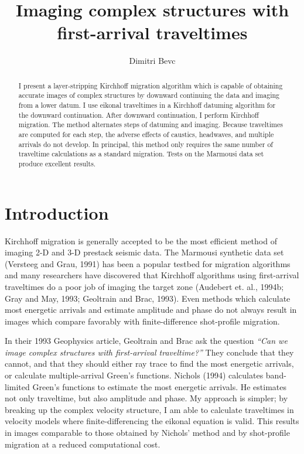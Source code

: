 \title{Imaging complex structures with first-arrival traveltimes}
\author{Dimitri Bevc}
\def\figdir{./Fig}

\begin{abstract}
I present a layer-stripping Kirchhoff migration algorithm which is
capable of obtaining accurate
images of complex structures by downward continuing
the data and imaging from a lower datum.
I use eikonal traveltimes in a Kirchhoff datuming algorithm for the
downward continuation. After downward continuation, I perform
Kirchhoff migration. 
The method alternates steps of datuming and imaging. Because traveltimes
are computed for each step, the adverse effects of caustics, headwaves, and 
multiple arrivals do not develop.
In principal, this method only requires the same number of
traveltime calculations as a standard migration.
Tests on the Marmousi data set produce excellent results.
\end{abstract}

\section{Introduction}
Kirchhoff migration is generally accepted to be the most efficient
method of imaging 2-D and 3-D prestack seismic data.
The Marmousi synthetic data set (Versteeg and Grau, 1991) has been a
popular testbed for migration algorithms and many researchers have discovered
that Kirchhoff algorithms using first-arrival traveltimes
do a poor job of imaging the target zone 
(Audebert et. al., 1994b; Gray and May, 1993; Geoltrain and Brac, 1993).
Even methods which calculate most energetic arrivals
and estimate amplitude and phase do not always result in images
which compare favorably with finite-difference shot-profile migration.

In their 1993 Geophysics article, Geoltrain and Brac ask the
question {\em ``Can we image complex structures with first-arrival
traveltime?''} They conclude that they cannot, and that they should 
either ray trace to find the most energetic arrivals, or calculate
multiple-arrival Green's functions. Nichols (1994) calculates 
band-limited Green's functions to estimate the most energetic
arrivals. He estimates not only traveltime, but also amplitude and
phase. My approach is simpler; by breaking up the complex
velocity structure, I am able 
to calculate traveltimes in velocity models where
finite-differencing the eikonal equation is valid.
This results in images comparable to those obtained by 
Nichols' method and by shot-profile migration at a reduced
computational cost.

